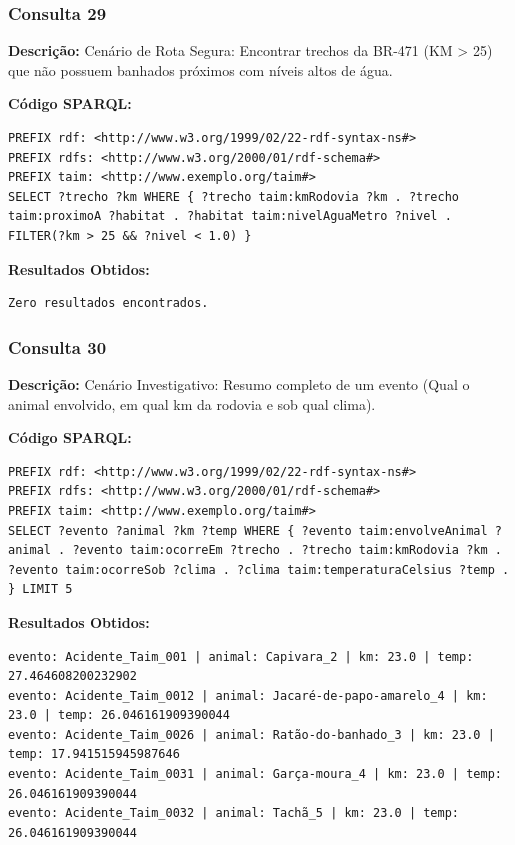 \documentclass[12pt,a4paper]{article}
\begin{document}
\vspace{1cm}
\subsubsection*{Consulta 29}

\textbf{Descrição:} Cenário de Rota Segura: Encontrar trechos da BR-471 (KM > 25) que não possuem banhados próximos com níveis altos de água.

\textbf{Código SPARQL:}
\begin{lstlisting}
PREFIX rdf: <http://www.w3.org/1999/02/22-rdf-syntax-ns#>
PREFIX rdfs: <http://www.w3.org/2000/01/rdf-schema#>
PREFIX taim: <http://www.exemplo.org/taim#>
SELECT ?trecho ?km WHERE { ?trecho taim:kmRodovia ?km . ?trecho taim:proximoA ?habitat . ?habitat taim:nivelAguaMetro ?nivel . FILTER(?km > 25 && ?nivel < 1.0) }
\end{lstlisting}

\textbf{Resultados Obtidos:}
\begin{lstlisting}
Zero resultados encontrados.
\end{lstlisting}

\vspace{1cm}
\subsubsection*{Consulta 30}

\textbf{Descrição:} Cenário Investigativo: Resumo completo de um evento (Qual o animal envolvido, em qual km da rodovia e sob qual clima).

\textbf{Código SPARQL:}
\begin{lstlisting}
PREFIX rdf: <http://www.w3.org/1999/02/22-rdf-syntax-ns#>
PREFIX rdfs: <http://www.w3.org/2000/01/rdf-schema#>
PREFIX taim: <http://www.exemplo.org/taim#>
SELECT ?evento ?animal ?km ?temp WHERE { ?evento taim:envolveAnimal ?animal . ?evento taim:ocorreEm ?trecho . ?trecho taim:kmRodovia ?km . ?evento taim:ocorreSob ?clima . ?clima taim:temperaturaCelsius ?temp . } LIMIT 5
\end{lstlisting}

\textbf{Resultados Obtidos:}
\begin{lstlisting}
evento: Acidente_Taim_001 | animal: Capivara_2 | km: 23.0 | temp: 27.464608200232902
evento: Acidente_Taim_0012 | animal: Jacaré-de-papo-amarelo_4 | km: 23.0 | temp: 26.046161909390044
evento: Acidente_Taim_0026 | animal: Ratão-do-banhado_3 | km: 23.0 | temp: 17.941515945987646
evento: Acidente_Taim_0031 | animal: Garça-moura_4 | km: 23.0 | temp: 26.046161909390044
evento: Acidente_Taim_0032 | animal: Tachã_5 | km: 23.0 | temp: 26.046161909390044
\end{lstlisting}

\vspace{1cm}
\end{document}

